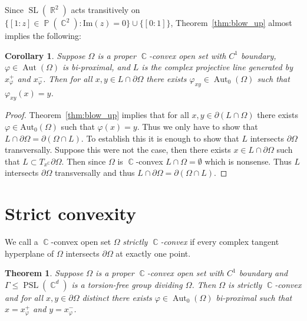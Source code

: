 \documentclass[12pt]{amsart}
\theoremstyle{plain}
\newtheorem{theorem}[proposition]{Theorem}
\newtheorem{corollary}[proposition]{Corollary}
\theoremstyle{definition}
\theoremstyle{remark}
\begin{document}
Since $\operatorname{SL}(\operatorname{\mathbb{R}}^2)$ acts transitively on $\{ [1:z] \in \operatorname{\mathbb{P}}(\operatorname{\mathbb{C}}^2) : \mathrm{Im}(z)=0\} \cup \{ [0:1]\}$, Theorem~\ref{thm:blow_up} almost implies the following:

\begin{corollary}
\label{cor:bi_3}
Suppose $\Omega$ is a proper $\operatorname{\mathbb{C}}$-convex open set with $C^1$ boundary, $\varphi \in \operatorname{Aut}(\Omega)$ is bi-proximal, and $L$ is the complex projective line generated by $x^+_{\varphi}$ and $x^-_{\varphi}$. Then for all $x,y \in L \cap \partial\Omega$ there exists $\varphi_{xy} \in \operatorname{Aut}_0(\Omega)$ such that $\varphi_{xy}(x)=y$.
\end{corollary}

\begin{proof}
Theorem~\ref{thm:blow_up} implies that for all $x,y \in \partial(L \cap \Omega)$ there exists $\varphi \in \text{Aut}_0(\Omega)$ such that $\varphi(x)=y$. Thus we only have to show that $L \cap \partial \Omega = \partial (\Omega \cap L)$. To establish this it is enough to show that $L$ intersects $\partial \Omega$ transversally. Suppose this were not the case, then there exists $x \in L \cap \partial \Omega$ such that $L \subset T_x^\operatorname{\mathbb{C}} \partial \Omega$. Then since $\Omega$ is $\operatorname{\mathbb{C}}$-convex $L \cap \Omega = \emptyset$ which is nonsense. Thus $L$ intersects $\partial \Omega$ transversally and thus $L \cap \partial \Omega = \partial (\Omega \cap L)$.
\end{proof}

\section{Strict convexity}\label{sec:str}

We call a $\operatorname{\mathbb{C}}$-convex open set $\Omega$ \emph{strictly $\operatorname{\mathbb{C}}$-convex} if every complex tangent hyperplane of $\Omega$ intersects $\partial\Omega$ at exactly one point. 

\begin{theorem}
\label{thm:str}
Suppose $\Omega$ is a proper $\operatorname{\mathbb{C}}$-convex open set with $C^1$ boundary and $\Gamma \leq \operatorname{PSL}(\operatorname{\mathbb{C}}^d)$ is a torsion-free group dividing $\Omega$. Then $\Omega$ is strictly $\operatorname{\mathbb{C}}$-convex and for all $x,y \in \partial \Omega$ distinct there exists $\varphi \in \operatorname{Aut}_0(\Omega)$ bi-proximal such that $x=x^+_{\varphi}$ and $y=x^-_{\varphi}$.
\end{theorem}
\end{document}

